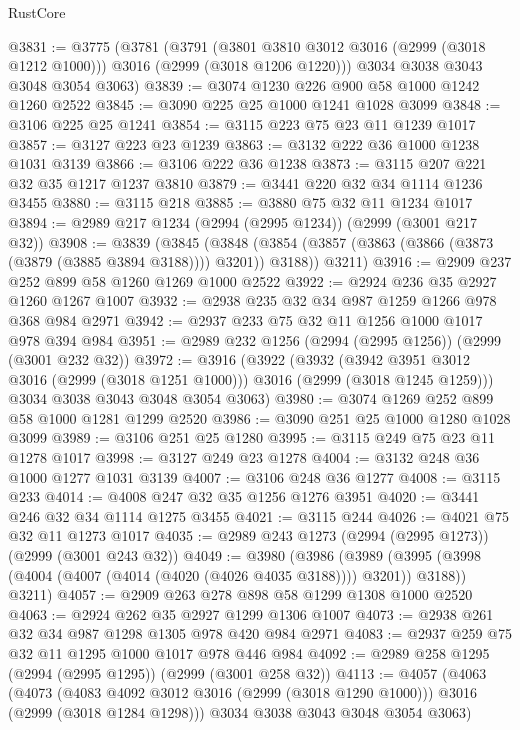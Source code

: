 \begin{lexlean}{RustCore}
\begin{coremodule}
@3831 := @3775
    (@3781
      (@3791
        (@3801 @3810 @3012 @3016 (@2999 (@3018 @1212 @1000)))
        @3016
        (@2999 (@3018 @1206 @1220)))
      @3034
      @3038
      @3043
      @3048
      @3054
      @3063)
@3839 := @3074 @1230 @226 @900 @58 @1000 @1242 @1260 @2522
@3845 := @3090 @225 @25 @1000 @1241 @1028 @3099
@3848 := @3106 @225 @25 @1241
@3854 := @3115 @223 @75 @23 @11 @1239 @1017
@3857 := @3127 @223 @23 @1239
@3863 := @3132 @222 @36 @1000 @1238 @1031 @3139
@3866 := @3106 @222 @36 @1238
@3873 := @3115 @207 @221 @32 @35 @1217 @1237 @3810
@3879 := @3441 @220 @32 @34 @1114 @1236 @3455
@3880 := @3115 @218
@3885 := @3880 @75 @32 @11 @1234 @1017
@3894 := @2989 @217 @1234 (@2994 (@2995 @1234)) (@2999 (@3001 @217 @32))
@3908 := @3839
    (@3845
      (@3848 (@3854 (@3857 (@3863 (@3866 (@3873 (@3879 (@3885 @3894 @3188)))) @3201)) @3188))
      @3211)
@3916 := @2909 @237 @252 @899 @58 @1260 @1269 @1000 @2522
@3922 := @2924 @236 @35 @2927 @1260 @1267 @1007
@3932 := @2938 @235 @32 @34 @987 @1259 @1266 @978 @368 @984 @2971
@3942 := @2937 @233 @75 @32 @11 @1256 @1000 @1017 @978 @394 @984
@3951 := @2989 @232 @1256 (@2994 (@2995 @1256)) (@2999 (@3001 @232 @32))
@3972 := @3916
    (@3922
      (@3932
        (@3942 @3951 @3012 @3016 (@2999 (@3018 @1251 @1000)))
        @3016
        (@2999 (@3018 @1245 @1259)))
      @3034
      @3038
      @3043
      @3048
      @3054
      @3063)
@3980 := @3074 @1269 @252 @899 @58 @1000 @1281 @1299 @2520
@3986 := @3090 @251 @25 @1000 @1280 @1028 @3099
@3989 := @3106 @251 @25 @1280
@3995 := @3115 @249 @75 @23 @11 @1278 @1017
@3998 := @3127 @249 @23 @1278
@4004 := @3132 @248 @36 @1000 @1277 @1031 @3139
@4007 := @3106 @248 @36 @1277
@4008 := @3115 @233
@4014 := @4008 @247 @32 @35 @1256 @1276 @3951
@4020 := @3441 @246 @32 @34 @1114 @1275 @3455
@4021 := @3115 @244
@4026 := @4021 @75 @32 @11 @1273 @1017
@4035 := @2989 @243 @1273 (@2994 (@2995 @1273)) (@2999 (@3001 @243 @32))
@4049 := @3980
    (@3986
      (@3989 (@3995 (@3998 (@4004 (@4007 (@4014 (@4020 (@4026 @4035 @3188)))) @3201)) @3188))
      @3211)
@4057 := @2909 @263 @278 @898 @58 @1299 @1308 @1000 @2520
@4063 := @2924 @262 @35 @2927 @1299 @1306 @1007
@4073 := @2938 @261 @32 @34 @987 @1298 @1305 @978 @420 @984 @2971
@4083 := @2937 @259 @75 @32 @11 @1295 @1000 @1017 @978 @446 @984
@4092 := @2989 @258 @1295 (@2994 (@2995 @1295)) (@2999 (@3001 @258 @32))
@4113 := @4057
    (@4063
      (@4073
        (@4083 @4092 @3012 @3016 (@2999 (@3018 @1290 @1000)))
        @3016
        (@2999 (@3018 @1284 @1298)))
      @3034
      @3038
      @3043
      @3048
      @3054
      @3063)

\end{coremodule}
\end{lexlean}
